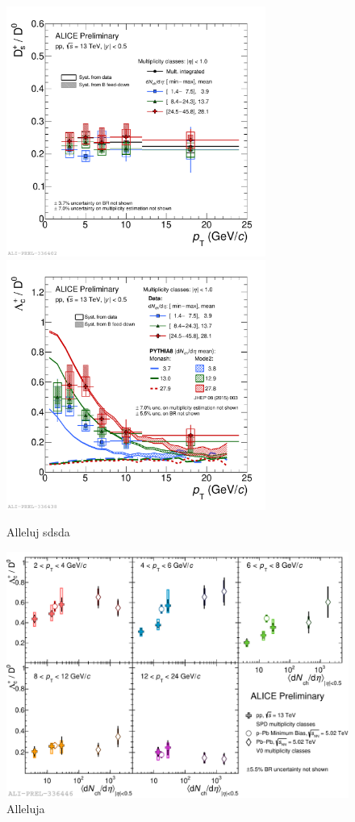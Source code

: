 \documentclass[3p,times,procedia]{elsarticle}
\begin{document}
\begin{figure}[h]
\includegraphics[width=8.5cm]{Plots/ppHM/2019-10-31-2019-10-31-DsOverD0_allMult_MB.pdf}
\includegraphics[width=8.5cm]{Plots/ppHM/2019-10-31-2019-10-31-LcpKpiOverD0_wPythiaMonashMode2_allMult.pdf}
\caption{Alleluj sdsda}
\label{fig:highmult}
\end{figure}

\begin{figure}[h]
\includegraphics[width=16cm]{Plots/ppHM/2019-10-31-2019-10-31-LcOverD0VsMult_pp_pPb_PbPb.pdf}
\caption{Alleluja}
\label{fig:LcDo_allsystems}
\end{figure}
\end{document}
